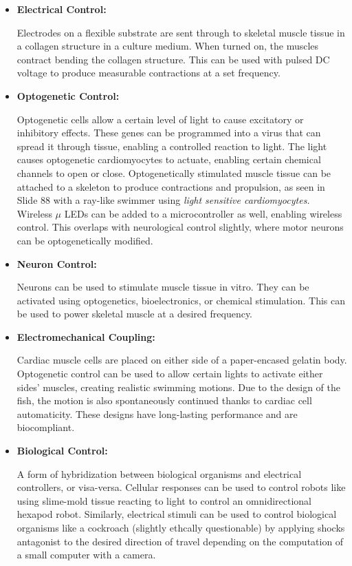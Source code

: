 \documentclass[onecolumn,a4paper]{article}
\begin{document}
\begin{itemize}
    \item \textbf{Electrical Control:}

    Electrodes on a flexible substrate are sent through to skeletal muscle tissue in a collagen structure in a culture medium. When turned on, the muscles contract bending the collagen structure. This can be used with pulsed DC voltage to produce measurable contractions at a set frequency.

    \item \textbf{Optogenetic Control:}

    Optogenetic cells allow a certain level of light to cause excitatory or inhibitory effects. These genes can be programmed into a virus that can spread it through tissue, enabling a controlled reaction to light. The light causes optogenetic cardiomyocytes to actuate, enabling certain chemical channels to open or close. Optogenetically stimulated muscle tissue can be attached to a skeleton to produce contractions and propulsion, as seen in Slide 88 with a ray-like swimmer using \emph{light sensitive cardiomyocytes.} Wireless $\mu$ LEDs can be added to a microcontroller as well, enabling wireless control. This overlaps with neurological control slightly, where motor neurons can be optogenetically modified.

    \item \textbf{Neuron Control:}

    Neurons can be used to stimulate muscle tissue in vitro. They can be activated using optogenetics, bioelectronics, or chemical stimulation. This can be used to power skeletal muscle at a desired frequency. 
    
    \item \textbf{Electromechanical Coupling:}

    Cardiac muscle cells are placed on either side of a paper-encased gelatin body. Optogenetic control can be used to allow certain lights to activate either sides' muscles, creating realistic swimming motions. Due to the design of the fish, the motion is also spontaneously continued thanks to cardiac cell automaticity. These designs have long-lasting performance and are biocompliant.

    \item \textbf{Biological Control:}

    A form of hybridization between biological organisms and electrical controllers, or visa-versa. Cellular responses can be used to control robots like using slime-mold tissue reacting to light to control an omnidirectional hexapod robot. Similarly, electrical stimuli can be used to control biological organisms like a cockroach (slightly ethcally questionable) by applying shocks antagonist to the desired direction of travel depending on the computation of a small computer with a camera.


\end{itemize}
\end{document}

